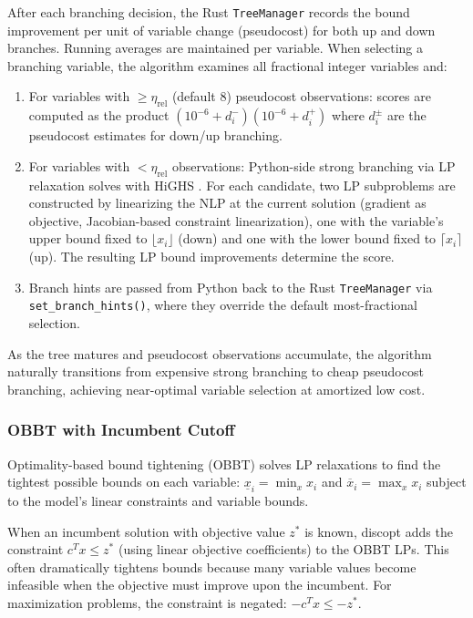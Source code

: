 \documentclass[12pt,preprint]{article}
\begin{document}
After each branching decision, the Rust \texttt{TreeManager} records the bound improvement per unit of variable change (pseudocost) for both up and down branches. Running averages are maintained per variable. When selecting a branching variable, the algorithm examines all fractional integer variables and:

\begin{enumerate}
\item For variables with $\ge \eta_{\text{rel}}$ (default 8) pseudocost observations: scores are computed as the product $(10^{-6} + d_i^-)(10^{-6} + d_i^+)$ where $d_i^{\pm}$ are the pseudocost estimates for down/up branching.
\item For variables with $< \eta_{\text{rel}}$ observations: Python-side strong branching via LP relaxation solves with HiGHS \cite{Huangfu2018}. For each candidate, two LP subproblems are constructed by linearizing the NLP at the current solution (gradient as objective, Jacobian-based constraint linearization), one with the variable's upper bound fixed to $\lfloor x_i \rfloor$ (down) and one with the lower bound fixed to $\lceil x_i \rceil$ (up). The resulting LP bound improvements determine the score.
\item Branch hints are passed from Python back to the Rust \texttt{TreeManager} via \texttt{set\_branch\_hints()}, where they override the default most-fractional selection.
\end{enumerate}

As the tree matures and pseudocost observations accumulate, the algorithm naturally transitions from expensive strong branching to cheap pseudocost branching, achieving near-optimal variable selection at amortized low cost.

\subsubsection{OBBT with Incumbent Cutoff}
\label{org-obbt-incumbent-cutoff}
Optimality-based bound tightening (OBBT) \cite{Gleixner2017} solves LP relaxations to find the tightest possible bounds on each variable: $\underline{x}_i = \min_{x} x_i$ and $\overline{x}_i = \max_{x} x_i$ subject to the model's linear constraints and variable bounds.

When an incumbent solution with objective value $z^*$ is known, discopt adds the constraint $c^T x \le z^*$ (using linear objective coefficients) to the OBBT LPs. This often dramatically tightens bounds because many variable values become infeasible when the objective must improve upon the incumbent. For maximization problems, the constraint is negated: $-c^T x \le -z^*$.
\end{document}
